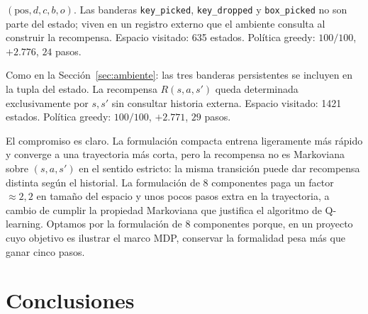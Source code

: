 \documentclass[11pt,a4paper]{article}
\begin{document}
\begin{description}[leftmargin=0.6cm]
  \item[Formulación compacta (5 componentes)]
    \((\text{pos}, d, c, b, o)\). Las banderas \texttt{key\_picked},
    \texttt{key\_dropped} y \texttt{box\_picked} no son parte del
    estado; viven en un registro externo que el ambiente consulta al
    construir la recompensa. Espacio visitado: \num{635} estados.
    Política greedy: \(100/100\), \(+2.776\), \(24\) pasos.
  \item[Formulación markoviana (8 componentes)]
    Como en la Sección~\ref{sec:ambiente}: las tres banderas
    persistentes se incluyen en la tupla del estado. La recompensa
    \(R(s, a, s')\) queda determinada exclusivamente por \(s, s'\) sin
    consultar historia externa. Espacio visitado: \num{1421} estados.
    Política greedy: \(100/100\), \(+2.771\), \(29\) pasos.
\end{description}

El compromiso es claro. La formulación compacta entrena ligeramente más
rápido y converge a una trayectoria más corta, pero la recompensa no es
Markoviana sobre \((s, a, s')\) en el sentido estricto: la misma
transición puede dar recompensa distinta según el historial. La
formulación de 8 componentes paga un factor \(\approx 2{,}2\) en
tamaño del espacio y unos pocos pasos extra en la trayectoria, a
cambio de cumplir la propiedad Markoviana que justifica el algoritmo
de Q-learning. Optamos por la formulación de 8 componentes porque, en
un proyecto cuyo objetivo es ilustrar el marco MDP, conservar la
formalidad pesa más que ganar cinco pasos.

\section{Conclusiones}
\label{sec:conclusiones}
\end{document}
